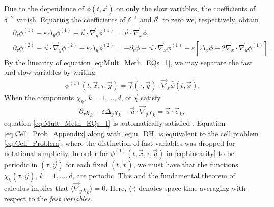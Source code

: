 \documentclass[11pt]{amsart}
\begin{document}
Due to the dependence of $\bar{\phi}(t,\vec{x})$ on only the
slow variables, the coefficients of $\delta^{-2}$ vanish. Equating the
coefficients of $\delta^{-1}$ and $\delta^0$ to zero we, respectively, obtain 
%
\begin{align}
  \label{eq:Mult_Meth_EQs_1}
  &\partial_\tau\phi^{(1)}-\varepsilon\Delta_y\phi^{(1)}-\vec{u}\cdot\vec{\nabla}_y\phi^{(1)}=\vec{u}\cdot\vec{\nabla}_x\bar{\phi},
  \\
  \label{eq:Mult_Meth_EQs_2}
  &\partial_\tau\phi^{(2)}-\vec{u}\cdot\vec{\nabla}_y\phi^{(2)}-\varepsilon\Delta_y\phi^{(2)}
  =-\partial_t\bar{\phi}+\vec{u}\cdot\vec{\nabla}_x\phi^{(1)}+\varepsilon[\Delta_x\bar{\phi}+2\vec{\nabla}_x\cdot\vec{\nabla}_y\phi^{(1)}].
\end{align}
%
By the linearity of equation \eqref{eq:Mult_Meth_EQs_1}, we may
separate the fast and slow variables by writing
\cite{McLaughlin:SIAM_JAM:780}
%
\begin{align}\label{eq:Linearity}
  \phi^{(1)}(t,\vec{x},\tau,\vec{y})
    =%
    \vec{\chi}(\tau,\vec{y})\cdot\vec{\nabla}_x\bar{\phi}(t,\vec{x}).
\end{align}
%
When
the components $\chi_k$, $k=1,\ldots,d$, of $\vec{\chi}$ satisfy   
%
\begin{align}\label{eq:Cell_Prob_Appendix}
  \partial_\tau\chi_k-\varepsilon\Delta_y\chi_k-\vec{u}\cdot\vec{\nabla}_y\chi_k=\vec{u}\cdot\vec{e}_k,
\end{align}
%
equation \eqref{eq:Mult_Meth_EQs_1} is automatically satisfied
\cite{McLaughlin:SIAM_JAM:780}. Equation \eqref{eq:Cell_Prob_Appendix}
along with \eqref{eq:u_DH} is equivalent to the cell problem
\eqref{eq:Cell_Problem}, where the distinction of fast variables was
dropped for notational simplicity. In order for
$\phi^{(1)}(t,\vec{x},\tau,\vec{y})$ in \eqref{eq:Linearity} to be periodic  
in $(\tau,\vec{y})$ for each fixed $(t,\vec{x})$, we must have that the
functions $\chi_k(\tau,\vec{y})$, $k=1,\ldots,d$, are periodic. This and the
fundamental theorem of calculus implies that $\langle\vec{\nabla}_y\chi_k\rangle=0$. Here,
$\langle\cdot\rangle$ denotes space-time averaging with respect to the \emph{fast
  variables}.    
\end{document}
